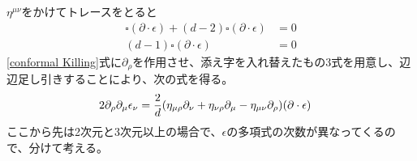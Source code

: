\documentclass[11pt, dvipdfmx]{article}
\numberwithin{equation}{section}
\begin{document}
$\eta^{\mu\nu}$をかけてトレースをとると
\begin{align}   
    \square(\partial\cdot\epsilon) +(d-2)\square(\partial\cdot\epsilon)&=0\\
    (d-1)\square(\partial\cdot\epsilon)&=0\label{box divergence epsilon}
\end{align}
\eqref{conformal Killing}式に$\partial_\rho $を作用させ、添え字を入れ替えたもの3式を用意し、辺辺足し引きすることにより、次の式を得る。
\begin{align}
    2\partial_\rho\partial_\mu \epsilon_\nu &= \frac{2}{d}\qty(\eta_{\mu\rho}\partial_\nu + \eta_{\nu\rho}\partial_\mu - \eta_{\mu\nu}\partial_\rho)(\partial\cdot\epsilon)\label{second derivative epsilon}
\end{align}
ここから先は2次元と3次元以上の場合で、$\epsilon$の多項式の次数が異なってくるので、分けて考える。
\end{document}
